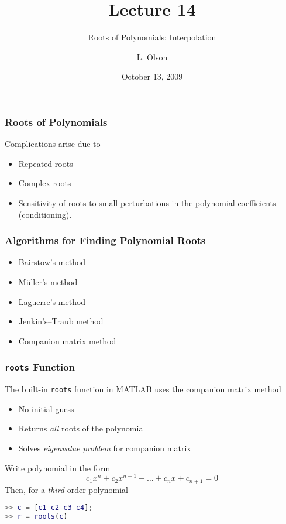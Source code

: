 \documentclass[10pt]{beamer}
\author{L. Olson}
\institute[UIUC]
{Department of Computer Science\\
University of Illinois at Urbana-Champaign\\
\vspace{0.5cm}
}
\title[CS 357]{Lecture 14}
\subtitle{Roots of Polynomials; Interpolation}
\date{October 13, 2009}
\begin{document}
\begin{frame}
  \titlepage
\end{frame}
\begin{frame}
\frametitle{Roots of Polynomials}

Complications arise due to
\begin{itemize}
    \item   Repeated roots
    \item   Complex roots
    \item   Sensitivity of roots to small perturbations
            in the polynomial coefficients (conditioning).
\end{itemize}
\vspace{4ex}

\centerline{}


\end{frame}
\begin{frame}
\frametitle{Algorithms for Finding Polynomial Roots}

\begin{itemize}
    \item   Bairstow's method
    \item   M\"{u}ller's method
    \item   Laguerre's method
    \item   Jenkin's--Traub method
    \item   Companion matrix method
\end{itemize}

\end{frame}
\begin{frame}[fragile]
\frametitle{\texttt{roots} Function}

The built-in \texttt{roots} function in MATLAB uses the companion matrix method
\begin{itemize}
    \item   No initial guess
    \item   Returns \emph{all} roots of the polynomial
    \item   Solves \emph{eigenvalue problem} for companion matrix
\end{itemize}

\vspace{4ex}
Write polynomial in the form
\begin{equation*}
    c_1 x^n + c_2 x^{n-1} + \ldots + c_n x + c_{n+1} = 0
\end{equation*}
Then, for a \emph{third} order polynomial
\begin{lstlisting}[language=matlab]
>> c = [c1 c2 c3 c4];
>> r = roots(c)
\end{lstlisting}

\end{frame}
\end{document}
